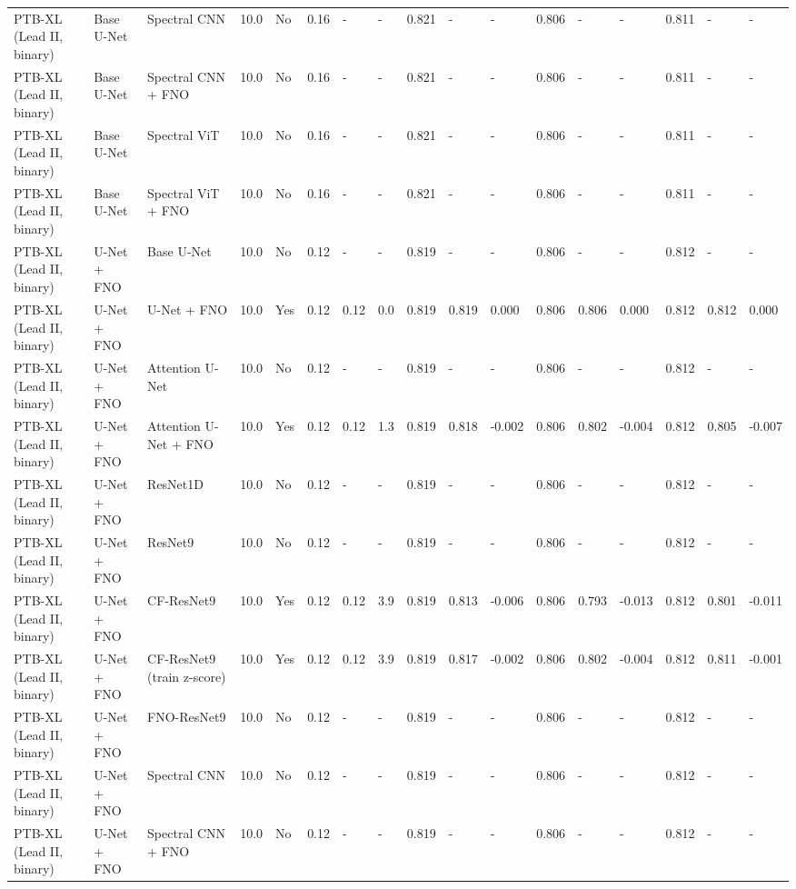 \begin{longtable}{lllllllllllllllll}
PTB-XL (Lead II, binary) & Base U-Net & Spectral CNN & 10.0 & No & 0.16 & - & - & 0.821 & - & - & 0.806 & - & - & 0.811 & - & - \\
PTB-XL (Lead II, binary) & Base U-Net & Spectral CNN + FNO & 10.0 & No & 0.16 & - & - & 0.821 & - & - & 0.806 & - & - & 0.811 & - & - \\
PTB-XL (Lead II, binary) & Base U-Net & Spectral ViT & 10.0 & No & 0.16 & - & - & 0.821 & - & - & 0.806 & - & - & 0.811 & - & - \\
PTB-XL (Lead II, binary) & Base U-Net & Spectral ViT + FNO & 10.0 & No & 0.16 & - & - & 0.821 & - & - & 0.806 & - & - & 0.811 & - & - \\
PTB-XL (Lead II, binary) & U-Net + FNO & Base U-Net & 10.0 & No & 0.12 & - & - & 0.819 & - & - & 0.806 & - & - & 0.812 & - & - \\
PTB-XL (Lead II, binary) & U-Net + FNO & U-Net + FNO & 10.0 & Yes & 0.12 & 0.12 & 0.0 & 0.819 & 0.819 & 0.000 & 0.806 & 0.806 & 0.000 & 0.812 & 0.812 & 0.000 \\
PTB-XL (Lead II, binary) & U-Net + FNO & Attention U-Net & 10.0 & No & 0.12 & - & - & 0.819 & - & - & 0.806 & - & - & 0.812 & - & - \\
PTB-XL (Lead II, binary) & U-Net + FNO & Attention U-Net + FNO & 10.0 & Yes & 0.12 & 0.12 & 1.3 & 0.819 & 0.818 & -0.002 & 0.806 & 0.802 & -0.004 & 0.812 & 0.805 & -0.007 \\
PTB-XL (Lead II, binary) & U-Net + FNO & ResNet1D & 10.0 & No & 0.12 & - & - & 0.819 & - & - & 0.806 & - & - & 0.812 & - & - \\
PTB-XL (Lead II, binary) & U-Net + FNO & ResNet9 & 10.0 & No & 0.12 & - & - & 0.819 & - & - & 0.806 & - & - & 0.812 & - & - \\
PTB-XL (Lead II, binary) & U-Net + FNO & CF-ResNet9 & 10.0 & Yes & 0.12 & 0.12 & 3.9 & 0.819 & 0.813 & -0.006 & 0.806 & 0.793 & -0.013 & 0.812 & 0.801 & -0.011 \\
PTB-XL (Lead II, binary) & U-Net + FNO & CF-ResNet9 (train z-score) & 10.0 & Yes & 0.12 & 0.12 & 3.9 & 0.819 & 0.817 & -0.002 & 0.806 & 0.802 & -0.004 & 0.812 & 0.811 & -0.001 \\
PTB-XL (Lead II, binary) & U-Net + FNO & FNO-ResNet9 & 10.0 & No & 0.12 & - & - & 0.819 & - & - & 0.806 & - & - & 0.812 & - & - \\
PTB-XL (Lead II, binary) & U-Net + FNO & Spectral CNN & 10.0 & No & 0.12 & - & - & 0.819 & - & - & 0.806 & - & - & 0.812 & - & - \\
PTB-XL (Lead II, binary) & U-Net + FNO & Spectral CNN + FNO & 10.0 & No & 0.12 & - & - & 0.819 & - & - & 0.806 & - & - & 0.812 & - & - \\

\end{longtable}
